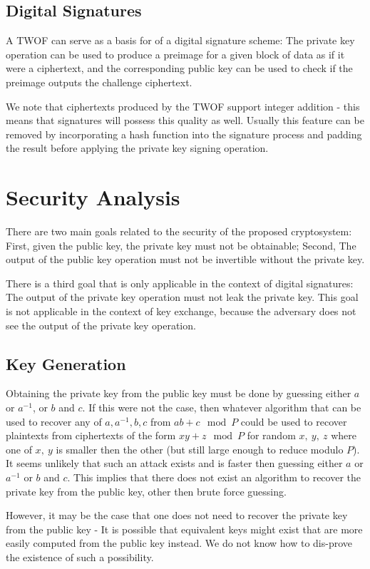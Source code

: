 \documentclass[preprint]{iacrtrans}
\begin{document}
\subsection{Digital Signatures}
A TWOF can serve as a basis for of a digital signature scheme: The private key operation can be used to produce a preimage for a given block of data as if it were a ciphertext, and the corresponding public key can be used to check if the preimage outputs the challenge ciphertext. 

We note that ciphertexts produced by the TWOF support integer addition - this means that signatures will possess this quality as well. Usually this feature can be removed by incorporating a hash function into the signature process and padding the result before applying the private key signing operation. 

\section{Security Analysis}
There are two main goals related to the security of the proposed cryptosystem: First, given the public key, the private key must not be obtainable; Second, The output of the public key operation must not be invertible without the private key.

There is a third goal that is only applicable in the context of digital signatures: The output of the private key operation must not leak the private key. This goal is not applicable in the context of key exchange, because the adversary does not see the output of the private key operation.

\subsection{Key Generation}
Obtaining the private key from the public key must be done by guessing either $a$ or $a^{-1}$, or $b$ and $c$. If this were not the case, then whatever algorithm that can be used to recover any of $a, a^{-1}, b, c$ from $a b + c \mod P$ could be used to recover plaintexts from ciphertexts of the form $x y + z \mod P$ for random $x,\ y,\ z$ where one of $x,\ y$ is smaller then the other (but still large enough to reduce modulo $P$). It seems unlikely that such an attack exists and is faster then guessing either $a$ or $a^{-1}$ or $b$ and $c$. This implies that there does not exist an algorithm to recover the private key from the public key, other then brute force guessing.

However, it may be the case that one does not need to recover the private key from the public key - It is possible that equivalent keys might exist that are more easily computed from the public key instead. We do not know how to dis-prove the existence of such a possibility.
\end{document}
